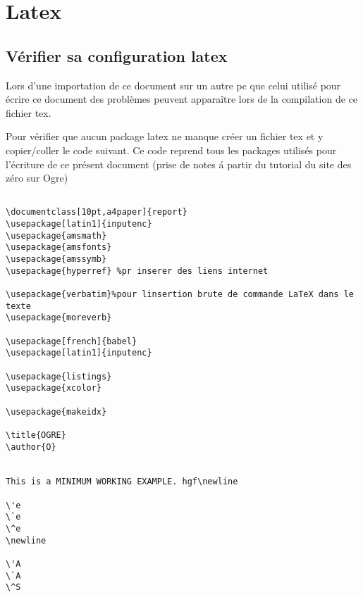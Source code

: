 
\chapter{Latex}

\section{V\'erifier sa configuration latex}
Lors d'une importation de ce document sur un autre pc que celui utilis\'e pour \'ecrire ce document des probl\`emes peuvent appara\^itre lors de la compilation de ce fichier tex.\newline

Pour v\'erifier que aucun package latex ne manque cr\'eer un fichier tex et y copier/coller le code suivant. Ce code reprend tous les packages utilis\'es pour l'\'ecriture de ce pr\'esent document (prise de notes \'a partir du tutorial du site des z\'ero sur Ogre)










\begin{lstlisting}[caption={Code Latex minimal pour tester les packages latex n\'ecessaires \'a la compilation du fichier ****-ergo.tex par texmaker}]

\documentclass[10pt,a4paper]{report}
\usepackage[latin1]{inputenc}
\usepackage{amsmath}
\usepackage{amsfonts}
\usepackage{amssymb}
\usepackage{hyperref} %pr inserer des liens internet

\usepackage{verbatim}%pour linsertion brute de commande LaTeX dans le texte
\usepackage{moreverb}

\usepackage[french]{babel}
\usepackage[latin1]{inputenc}

\usepackage{listings}
\usepackage{xcolor}

\usepackage{makeidx}

\title{OGRE}
\author{O}


This is a MINIMUM WORKING EXAMPLE. hgf\newline

\'e
\`e
\^e
\newline

\'A
\`A
\^S


\end{lstlisting}




















